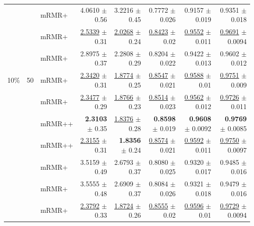 \begin{longtable}{llp{}rrrrr}
 &  & mRMR+ & 4.0610 {\scriptsize $\pm$ 0.56} & 3.2216 {\scriptsize $\pm$ 0.45} & 0.7772 {\scriptsize $\pm$ 0.026} & 0.9157 {\scriptsize $\pm$ 0.019} & 0.9351 {\scriptsize $\pm$ 0.018} \\
 &  & mRMR+ & \underline{2.5339} {\scriptsize $\pm$ 0.31} & \underline{2.0268} {\scriptsize $\pm$ 0.24} & \underline{0.8423} {\scriptsize $\pm$ 0.02} & \underline{0.9552} {\scriptsize $\pm$ 0.011} & \underline{0.9691} {\scriptsize $\pm$ 0.0094} \\
 &  & mRMR+ & 2.8975 {\scriptsize $\pm$ 0.37} & 2.2808 {\scriptsize $\pm$ 0.29} & 0.8204 {\scriptsize $\pm$ 0.022} & 0.9422 {\scriptsize $\pm$ 0.013} & 0.9602 {\scriptsize $\pm$ 0.012} \\
\midrule
10\% & 50 & mRMR+ & \underline{2.3420} {\scriptsize $\pm$ 0.31} & \underline{1.8774} {\scriptsize $\pm$ 0.25} & \underline{0.8547} {\scriptsize $\pm$ 0.021} & \underline{0.9588} {\scriptsize $\pm$ 0.01} & \underline{0.9751} {\scriptsize $\pm$ 0.009} \\
 &  & mRMR+ & \underline{2.3477} {\scriptsize $\pm$ 0.29} & \underline{1.8766} {\scriptsize $\pm$ 0.23} & \underline{0.8514} {\scriptsize $\pm$ 0.023} & \underline{0.9562} {\scriptsize $\pm$ 0.012} & \underline{0.9726} {\scriptsize $\pm$ 0.011} \\
 &  & mRMR++ & \textbf{2.3103} {\scriptsize $\pm$ 0.35} & \underline{1.8376} {\scriptsize $\pm$ 0.28} & \textbf{0.8598} {\scriptsize $\pm$ 0.019} & \textbf{0.9608} {\scriptsize $\pm$ 0.0092} & \textbf{0.9769} {\scriptsize $\pm$ 0.0085} \\
 &  & mRMR++ & \underline{2.3155} {\scriptsize $\pm$ 0.31} & \textbf{1.8356} {\scriptsize $\pm$ 0.24} & \underline{0.8574} {\scriptsize $\pm$ 0.021} & \underline{0.9592} {\scriptsize $\pm$ 0.011} & \underline{0.9750} {\scriptsize $\pm$ 0.0097} \\
 &  & mRMR+ & 3.5159 {\scriptsize $\pm$ 0.49} & 2.6793 {\scriptsize $\pm$ 0.37} & 0.8080 {\scriptsize $\pm$ 0.025} & 0.9320 {\scriptsize $\pm$ 0.017} & 0.9485 {\scriptsize $\pm$ 0.016} \\
 &  & mRMR+ & 3.5555 {\scriptsize $\pm$ 0.48} & 2.6909 {\scriptsize $\pm$ 0.37} & 0.8084 {\scriptsize $\pm$ 0.026} & 0.9321 {\scriptsize $\pm$ 0.018} & 0.9479 {\scriptsize $\pm$ 0.016} \\
 &  & mRMR+ & \underline{2.3792} {\scriptsize $\pm$ 0.33} & \underline{1.8724} {\scriptsize $\pm$ 0.26} & \underline{0.8555} {\scriptsize $\pm$ 0.02} & \underline{0.9596} {\scriptsize $\pm$ 0.01} & \underline{0.9729} {\scriptsize $\pm$ 0.0094} \\

\end{longtable}
